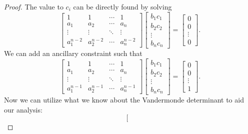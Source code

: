 \begin{proof}
    The value to $c_i$ can be directly found by solving
    \begin{equation*}
        \left[\begin{matrix}
            1 & 1 & \cdots & 1 \\
            a_1 & a_2 & \cdots & a_n \\
            \vdots & \vdots & \ddots & \vdots \\
            a_1^{n-2} & a_2^{n-2} & \cdots & a_n^{n-2}
        \end{matrix}\right] \left[\begin{matrix}
            b_1c_1 \\ b_2c_2 \\ \vdots \\ b_nc_n
        \end{matrix}\right] = \left[\begin{matrix}
            0 \\ 0 \\ \vdots \\ 0
        \end{matrix}\right].
    \end{equation*}
    We can add an ancillary constraint such that
    \begin{equation}
        \left[\begin{matrix}
            1 & 1 & \cdots & 1 \\
            a_1 & a_2 & \cdots & a_n \\
            \vdots & \vdots & \ddots & \vdots \\
            a_1^{n-1} & a_2^{n-1} & \cdots & a_n^{n-1}
        \end{matrix}\right] \left[\begin{matrix}
            b_1c_1 \\ b_2c_2 \\ \vdots \\ b_nc_n
        \end{matrix}\right] = \left[\begin{matrix}
            0 \\ 0 \\ \vdots \\ 1
        \end{matrix}\right]. \label{eq:w7_vandermonde}
    \end{equation}
    Now we can utilize what we know about the Vandermonde determinant to aid our analysis:
    \begin{equation*}
        \left[\begin{matrix}

\end{matrix}
\end{equation*}
\end{proof}
